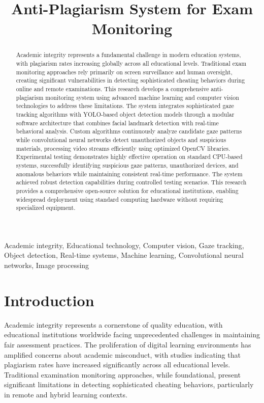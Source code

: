 \documentclass[conference]{IEEEtran}
\title{Anti-Plagiarism System for Exam Monitoring}
\author{
    \IEEEauthorblockN{Valentin Pletea-Marinescu}
    \IEEEauthorblockA{
        \textit{National University of Science and Technology POLITEHNICA Bucharest}\\
        Email: \texttt{pletea.valentin2003@gmail.com}
    }
}
\begin{document}
\maketitle

\begin{abstract}
Academic integrity represents a fundamental challenge in modern education systems, with plagiarism rates increasing globally across all educational levels. Traditional exam monitoring approaches rely primarily on screen surveillance and human oversight, creating significant vulnerabilities in detecting sophisticated cheating behaviors during online and remote examinations.
This research develops a comprehensive anti-plagiarism monitoring system using advanced machine learning and computer vision technologies to address these limitations. The system integrates sophisticated gaze tracking algorithms with YOLO-based object detection models through a modular software architecture that combines facial landmark detection with real-time behavioral analysis. Custom algorithms continuously analyze candidate gaze patterns while convolutional neural networks detect unauthorized objects and suspicious materials, processing video streams efficiently using optimized OpenCV libraries.
Experimental testing demonstrates highly effective operation on standard CPU-based systems, successfully identifying suspicious gaze patterns, unauthorized devices, and anomalous behaviors while maintaining consistent real-time performance. The system achieved robust detection capabilities during controlled testing scenarios. This research provides a comprehensive open-source solution for educational institutions, enabling widespread deployment using standard computing hardware without requiring specialized equipment.
\end{abstract}

\begin{IEEEkeywords}
Academic integrity, Educational technology, Computer vision, Gaze tracking, Object detection, Real-time systems, Machine learning, Convolutional neural networks, Image processing
\end{IEEEkeywords}

\section{Introduction}

Academic integrity represents a cornerstone of quality education, with educational institutions worldwide facing unprecedented challenges in maintaining fair assessment practices. The proliferation of digital learning environments has amplified concerns about academic misconduct, with studies indicating that plagiarism rates have increased significantly across all educational levels\cite{zimba2021plagiarism}. Traditional examination monitoring approaches, while foundational, present significant limitations in detecting sophisticated cheating behaviors, particularly in remote and hybrid learning contexts\cite{nazari2019detection}.
\end{document}
